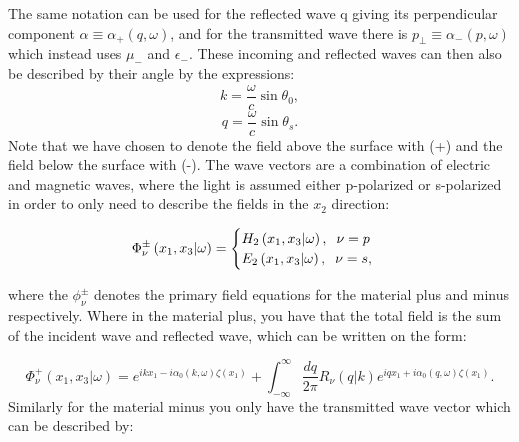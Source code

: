 \documentclass[../main.tex]{subfiles}
\begin{document}
The same notation can be used for the reflected wave q giving its perpendicular component $\alpha \equiv \alpha_+(q, \omega)$, and for the transmitted wave there is $p_\perp \equiv \alpha_-(p, \omega)$ which instead uses $\mu_-$ and $\epsilon_-$. These incoming and reflected waves can then also be described by their angle by the expressions: 
\begin{equation}
    k = \frac{\omega}{c}\sin \theta_0,
\label{k_by_angle}
\end{equation}
\begin{equation}
    q = \frac{\omega}{c}\sin \theta_s.
\label{q_by_angle}
\end{equation}
Note that we have chosen to denote the field above the surface with (+) and the field below the surface with (-). The wave vectors are a combination of electric and magnetic waves, where the light is assumed either p-polarized or s-polarized in order to only need to describe the fields in the $x_2$ direction:

\begin{equation}
  \Phi_{\nu}^{\pm}\left(x_1, x_3|\omega \right) =
    \begin{cases}
      H_2\left(x_1, x_3|\omega \right), \hspace{2mm} \nu = p\\
      E_2\left(x_1, x_3|\omega \right), \hspace{2mm} \nu = s,\\
    \end{cases}   
\label{primary_field_over_def}
\end{equation}

where the $\phi_{\nu}^{\pm}$ denotes the primary field equations for the material plus and minus respectively. Where in the material plus, you have that the total field is the sum of the incident wave and reflected wave, which can be written on the form:


\begin{equation}
    \Phi_{\nu}^{+}\left(x_1, x_3|\omega \right) = e^{ikx_1 - i\alpha_0\left(k,\omega \right)\zeta\left(x_1 \right)} + \int_{-\infty}^{\infty}\frac{dq}{2 \pi} R_{\nu}\left(q|k \right)e^{iqx_1+i\alpha_0\left(q,\omega \right)\zeta\left(x_1 \right)}.
\label{primary_field_plus}
\end{equation}
Similarly for the material minus you only have the transmitted wave vector which can be described by:
\end{document}
